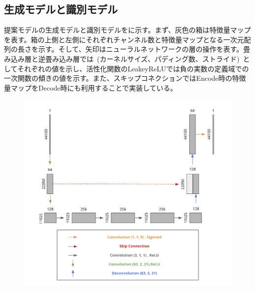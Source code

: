 \clearpage

\subsection{生成モデルと識別モデル}

提案モデルの生成モデルと識別モデルをに示す。まず、灰色の箱は特徴量マップを表す。箱の上側と左側にそれぞれチャンネル数と特徴量マップとなる一次元配列の長さを示す。そして、矢印はニューラルネットワークの層の操作を表す。畳み込み層と逆畳み込み層では~(カーネルサイズ、パディング数、ストライド)~としてそれぞれの値を示し、活性化関数のLeakeyReLUでは負の実数の定義域での一次関数の傾きの値を示す。また、スキップコネクションではEncode時の特徴量マップをDecode時にも利用することで実装している。

\begin{figure}[b]
\centering
\begin{minipage}[b]{0.6\columnwidth}
\centering
\includegraphics[width=\columnwidth]{figure/pr_generator.png}
\label{fig:pr_gen}
\end{minipage}\\
\begin{minipage}[b]{0.6\columnwidth}
\centering

\end{minipage}
\end{figure}
